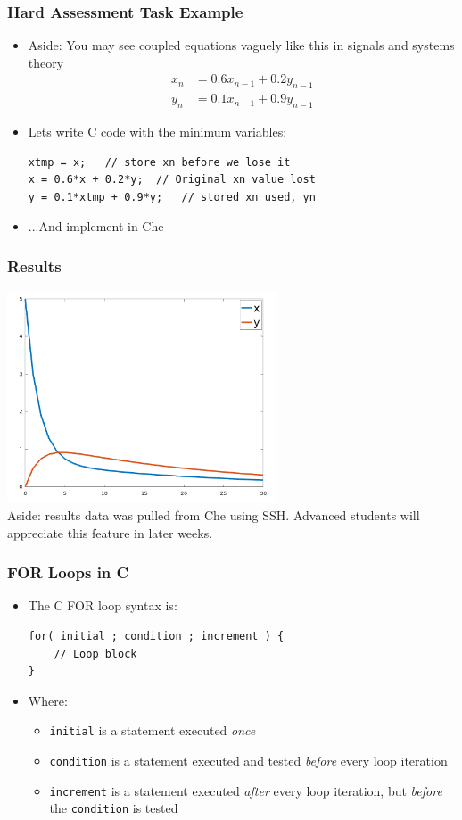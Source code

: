 \documentclass[14pt]{beamer}
\begin{document}
\begin{frame}[fragile]
\frametitle{Hard Assessment Task Example}
\begin{itemize}
\item Aside: You may see coupled equations vaguely like this in signals and systems theory
\begin{align*}
x_n &= 0.6x_{n-1} + 0.2y_{n-1}\\
y_n &= 0.1x_{n-1} + 0.9y_{n-1}
\end{align*}

\item Lets write C code with the minimum variables:
\begin{lstlisting}[style=pseudo]
xtmp = x;	// store xn before we lose it
x = 0.6*x + 0.2*y;	// Original xn value lost
y = 0.1*xtmp + 0.9*y;	// stored xn used, yn
\end{lstlisting}
\item ...And implement in Che
\end{itemize}
\end{frame}

\begin{frame}
\frametitle{Results}
\begin{center}
\includegraphics[width=0.6\textwidth]{coupled}\\
{\small Aside: results data was pulled from Che using SSH. Advanced students will appreciate this feature in later weeks.}
\end{center}
\end{frame}

\begin{frame}[fragile]
\frametitle{FOR Loops in C}
\begin{itemize}
\item The C FOR loop syntax is:
\begin{lstlisting}[style=CStyle]
for( initial ; condition ; increment ) {
	// Loop block
}
\end{lstlisting}
\item Where:
	\begin{itemize}
		\item \texttt{initial} is a statement executed \textit{once}
		\item \texttt{condition} is a statement executed and tested \textit{before} every loop iteration
		\item \texttt{increment} is a statement executed \textit{after} every loop iteration, but \textit{before} the \texttt{condition} is tested
	\end{itemize}
\end{itemize}
\end{frame}
\end{document}
